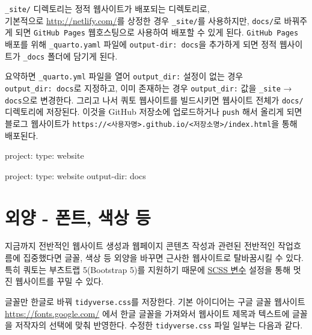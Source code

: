 \documentclass[
  letterpaper,
]{book}
\newenvironment{Shaded}{\begin{snugshade}}{\end{snugshade}}
\newcommand{\AttributeTok}[1]{\textcolor[rgb]{0.40,0.45,0.13}{#1}}
\newcommand{\FunctionTok}[1]{\textcolor[rgb]{0.28,0.35,0.67}{#1}}
\newcommand{\KeywordTok}[1]{\textcolor[rgb]{0.00,0.23,0.31}{#1}}
\begin{document}
\texttt{\_site/} 디렉토리는 정적 웹사이트가 배포되는 디렉토리로,\\
기본적으로 \url{http://netlify.com/}를 상정한 경우 \texttt{\_site/}를
사용하지만, \texttt{docs/}로 바꿔주게 되면 \texttt{GitHub\ Pages}
웹호스팅으로 사용하여 배포할 수 있게 된다. \texttt{GitHub\ Pages} 배포를
위해 \texttt{\_quarto.yaml} 파일에 \texttt{output-dir:\ docs}을 추가하게
되면 정적 웹사이트가 \texttt{\_docs} 폴더에 담기게 된다.

요약하면 \texttt{\_quarto.yml} 파일을 열어 \texttt{output\_dir:} 설정이
없는 경우 \texttt{output\_dir:\ docs}로 지정하고, 이미 존재하는 경우
\texttt{output\_dir:} 값을 \texttt{\_site} → \texttt{docs}으로 변경한다.
그리고 나서 쿼토 웹사이트를 빌드시키면 웹사이트 전체가 \texttt{docs/}
디렉토리에 저장된다. 이것을 GitHub 저장소에 업로드하거나 \texttt{push}
해서 올리게 되면 블로그 웹사이트가
\texttt{https://\textless{}사용자명\textgreater{}.github.io/\textless{}저장소명\textgreater{}/index.html}을
통해 배포된다.

\begin{Shaded}
\begin{Highlighting}[]
\FunctionTok{project}\KeywordTok{:}
\AttributeTok{  }\FunctionTok{type}\KeywordTok{:}\AttributeTok{ website}
\end{Highlighting}
\end{Shaded}

\begin{Shaded}
\begin{Highlighting}[]
\FunctionTok{project}\KeywordTok{:}
\AttributeTok{  }\FunctionTok{type}\KeywordTok{:}\AttributeTok{ website}
\AttributeTok{  }\FunctionTok{output{-}dir}\KeywordTok{:}\AttributeTok{ docs}
\end{Highlighting}
\end{Shaded}

\hypertarget{theme-distill}{%
\section{외양 - 폰트, 색상 등}\label{theme-distill}}

지금까지 전반적인 웹사이트 생성과 웹페이지 콘텐츠 작성과 관련된 전반적인
작업흐름에 집중했다면 글꼴, 색상 등 외양을 바꾸면 근사한 웹사이트로
탈바꿈시킬 수 있다. 특히 쿼토는 부츠트랩 5(Bootstrap 5)를 지원하기
때문에
\href{https://github.com/twbs/bootstrap/blob/main/scss/_variables.scss}{SCSS
변수} 설정을 통해 멋진 웹사이트를 꾸밀 수 있다.

글꼴만 한글로 바꿔 \texttt{tidyverse.css}를 저장한다. 기본 아이디어는
구글 글꼴 웹사이트 \url{https://fonts.google.com/} 에서 한글 글꼴을
가져와서 웹사이트 제목과 텍스트에 글꼴을 저작자의 선택에 맞춰 반영한다.
수정한 \texttt{tidyverse.css} 파일 일부는 다음과 같다.
\end{document}
